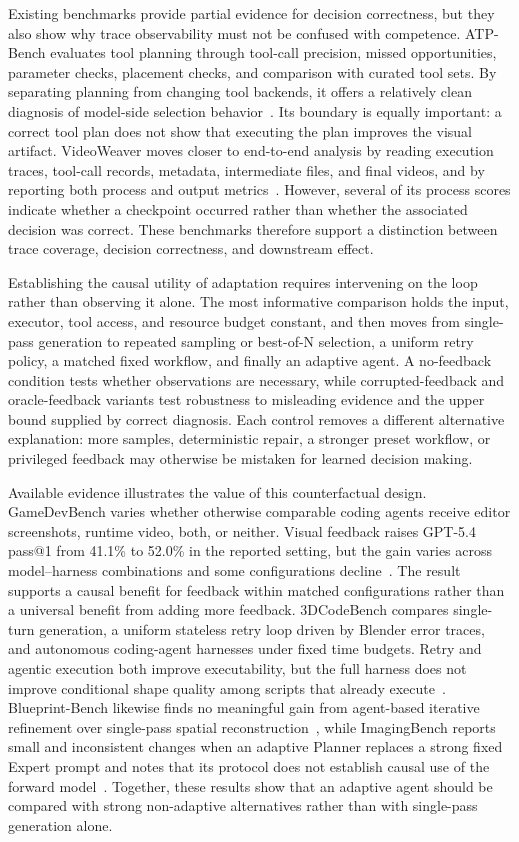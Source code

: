 Existing benchmarks provide partial evidence for decision correctness, but they also show why trace observability must not be confused with competence. ATP-Bench evaluates tool planning through tool-call precision, missed opportunities, parameter checks, placement checks, and comparison with curated tool sets. By separating planning from changing tool backends, it offers a relatively clean diagnosis of model-side selection behavior~\cite{avg260329902}. Its boundary is equally important: a correct tool plan does not show that executing the plan improves the visual artifact. VideoWeaver moves closer to end-to-end analysis by reading execution traces, tool-call records, metadata, intermediate files, and final videos, and by reporting both process and output metrics~\cite{avg260608091}. However, several of its process scores indicate whether a checkpoint occurred rather than whether the associated decision was correct. These benchmarks therefore support a distinction between trace coverage, decision correctness, and downstream effect.

Establishing the causal utility of adaptation requires intervening on the loop rather than observing it alone. The most informative comparison holds the input, executor, tool access, and resource budget constant, and then moves from single-pass generation to repeated sampling or best-of-N selection, a uniform retry policy, a matched fixed workflow, and finally an adaptive agent. A no-feedback condition tests whether observations are necessary, while corrupted-feedback and oracle-feedback variants test robustness to misleading evidence and the upper bound supplied by correct diagnosis. Each control removes a different alternative explanation: more samples, deterministic repair, a stronger preset workflow, or privileged feedback may otherwise be mistaken for learned decision making.

Available evidence illustrates the value of this counterfactual design. GameDevBench varies whether otherwise comparable coding agents receive editor screenshots, runtime video, both, or neither. Visual feedback raises GPT-5.4 pass@1 from 41.1\% to 52.0\% in the reported setting, but the gain varies across model--harness combinations and some configurations decline~\cite{avg260211103}. The result supports a causal benefit for feedback within matched configurations rather than a universal benefit from adding more feedback. 3DCodeBench compares single-turn generation, a uniform stateless retry loop driven by Blender error traces, and autonomous coding-agent harnesses under fixed time budgets. Retry and agentic execution both improve executability, but the full harness does not improve conditional shape quality among scripts that already execute~\cite{avg260601057}. Blueprint-Bench likewise finds no meaningful gain from agent-based iterative refinement over single-pass spatial reconstruction~\cite{avg250925229}, while ImagingBench reports small and inconsistent changes when an adaptive Planner replaces a strong fixed Expert prompt and notes that its protocol does not establish causal use of the forward model~\cite{avg260707189}. Together, these results show that an adaptive agent should be compared with strong non-adaptive alternatives rather than with single-pass generation alone.

